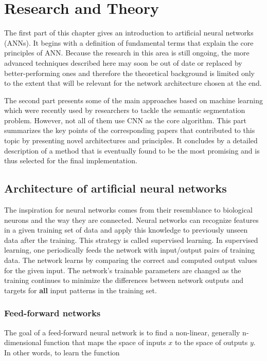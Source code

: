 \chapter{Research and Theory}
\label{research}
The first part of this chapter gives an introduction to artificial neural networks (ANNs). It begins with a definition of fundamental terms that explain the core principles of ANN. Because the research in this area is still ongoing, the more advanced techniques described here may soon be out of date or replaced by better-performing ones and therefore the theoretical background is limited only to the extent that will be relevant for the network architecture chosen at the end.

The second part presents some of the main approaches based on machine learning which were recently used by researchers to tackle the semantic segmentation problem. However, not all of them use CNN as the core algorithm. This part summarizes the key points of the corresponding papers that contributed to this topic by presenting novel architectures and principles. It concludes by a detailed description of a method that is eventually found to be the most promising and is thus selected for the final implementation.

\section{Architecture of artificial neural networks}

The inspiration for neural networks comes from their resemblance to biological neurons and the way they are connected. Neural networks can recognize features in a given training set of data and apply this knowledge to previously unseen data after the training. This strategy is called supervised learning. In supervised learning, one periodically feeds the network with input/output pairs of training data. The network learns by comparing the correct and computed output values for the given input. The network's trainable parameters are changed as the training continues to minimize the differences between network outputs and targets for \textbf{all} input patterns in the training set. \cite{mehlig}

\subsection{Feed-forward networks}

The goal of a feed-forward neural network is to find a non-linear, generally n-dimensional function that maps the space of inputs $ x $ to the space of outputs $ y $. In other words, to learn the function \cite{santiago}

